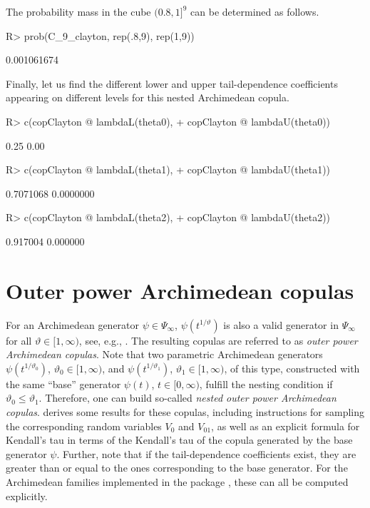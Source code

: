 \documentclass[nojss,article]{jss}
\theoremstyle{mythmstyle}
\newcommand*{\vt}{\vartheta}
\begin{document}
The probability mass in the cube  $(0.8, 1]^9$ can be determined as follows.
\begin{Schunk}
\begin{Sinput}
R> prob(C_9_clayton, rep(.8,9), rep(1,9))
\end{Sinput}
\begin{Soutput}
[1] 0.001061674
\end{Soutput}
\end{Schunk}

Finally, let us find the different lower and upper tail-dependence coefficients
appearing on different levels for this nested Archimedean copula.
\begin{Schunk}
\begin{Sinput}
R> c(copClayton @ lambdaL(theta0),
+    copClayton @ lambdaU(theta0))
\end{Sinput}
\begin{Soutput}
[1] 0.25 0.00
\end{Soutput}
\begin{Sinput}
R> c(copClayton @ lambdaL(theta1),
+    copClayton @ lambdaU(theta1))
\end{Sinput}
\begin{Soutput}
[1] 0.7071068 0.0000000
\end{Soutput}
\begin{Sinput}
R> c(copClayton @ lambdaL(theta2),
+    copClayton @ lambdaU(theta2))
\end{Sinput}
\begin{Soutput}
[1] 0.917004 0.000000
\end{Soutput}
\end{Schunk}

\section{Outer power Archimedean copulas}
For an Archimedean generator $\psi\in\Psi_\infty$, $\psi(t^{1/\vt})$ is also a
valid generator in $\Psi_\infty$ for all $\vt\in[1,\infty)$, see, e.g.,
\citet[p.\ 441]{feller1971}. The resulting copulas are
referred to as \textit{outer power Archimedean copulas}. Note that two
parametric Archimedean generators $\psi(t^{1/\vt_0})$, $\vt_0\in[1,\infty)$, and
$\psi(t^{1/\vt_1})$, $\vt_1\in[1,\infty)$, of this type, constructed with the
same ``base'' generator $\psi(t)$, $t\in[0,\infty)$, fulfill the nesting
condition if $\vt_0\le\vt_1$. Therefore, one can build so-called
\textit{nested outer power Archimedean copulas}.
\citet{hofert2010a} derives some results for
these copulas, including instructions for sampling the corresponding random
variables $V_0$ and $V_{01}$, as well as an explicit formula for Kendall's tau
in terms of the Kendall's tau of the copula generated by the base generator
$\psi$. Further, note that if the tail-dependence coefficients exist, they are
greater than or equal to the ones corresponding to the base generator.
For the Archimedean families implemented in the package , these
can all be computed explicitly.
\end{document}
